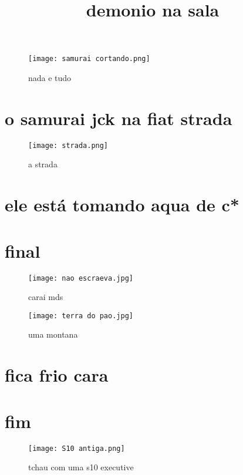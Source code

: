 \documentclass{article}
\begin{document}
\newpage

\begin{figure}
    \centering
    \texttt{[image: samurai cortando.png]}
    \caption{nada e tudo}
    \label{fig:enter-label}
\end{figure}

\title{demonio na sala}

\newpage

\section{o samurai jck na fiat strada}


\begin{figure}
    \centering
    \texttt{[image: strada.png]}
    \caption{a strada}
    \label{fig:enter-label}
\end{figure}

\section{ele está tomando aqua de c*}

\newpage
\section{final}

\begin{figure}
    \centering
    \texttt{[image: nao escraeva.jpg]}
    \caption{carai mds}
    \label{fig:enter-label}
\end{figure}

\newpage

\begin{figure}
    \centering
    \texttt{[image: terra do pao.jpg]}
    \caption{uma montana}
    \label{fig:enter-label}
\end{figure}

\section{fica frio cara}

\newpage

\section{fim}

\newpage

\begin{figure}
    \centering
    \texttt{[image: S10 antiga.png]}
    \caption{tchau com uma s10 executive}
    \label{fig:enter-label}
\end{figure}
\end{document}

